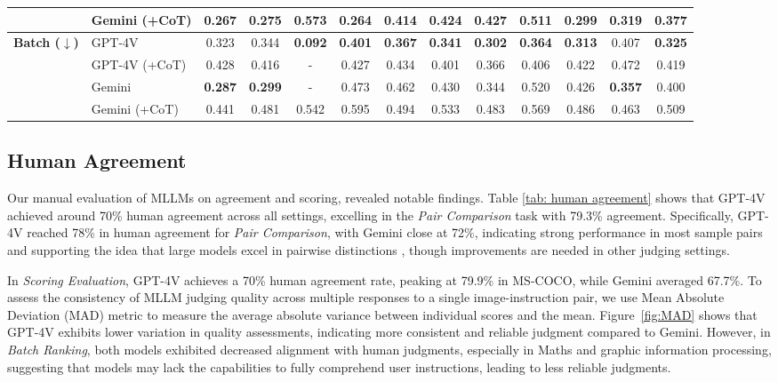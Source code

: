 \begin{table*}[ht]
{\begin{tabular}{ll|ccccccccccc}
 & Gemini (+CoT) & 0.267 & 0.275 & 0.573 & 0.264 & 0.414 & 0.424 & 0.427 & 0.511 & 0.299 & 0.319 & 0.377 \\ \midrule
\multirow{4}{*}{\textbf{Batch ($\downarrow$)}} & GPT-4V & 0.323 & 0.344 & \textbf{0.092} & \textbf{0.401} & \textbf{0.367} & \textbf{0.341} & \textbf{0.302} & \textbf{0.364} & \textbf{0.313} & 0.407 & \textbf{0.325} \\
 & GPT-4V (+CoT) & 0.428 & 0.416 & - & 0.427 & 0.434 & 0.401 & 0.366 & 0.406 & 0.422 & 0.472 & 0.419 \\
 & Gemini & \textbf{0.287} & \textbf{0.299} & - & 0.473 & 0.462 & 0.430 & 0.344 & 0.520 & 0.426 & \textbf{0.357} & 0.400 \\
 & Gemini (+CoT) & 0.441 & 0.481 & 0.542 & 0.595 & 0.494 & 0.533 & 0.483 & 0.569 & 0.486 & 0.463 & 0.509 \\
 \bottomrule[1.5pt]
\end{tabular}}
  \vspace{-10pt}
  \label{tab: COT result}
\end{table*}

\subsection{Human Agreement}
Our manual evaluation of MLLMs on agreement and scoring, revealed notable findings. Table \ref{tab: human agreement} shows that GPT-4V achieved around 70\% human agreement across all settings, excelling in the \textit{Pair Comparison} task with 79.3\% agreement. Specifically, GPT-4V reached 78\% in human agreement for \textit{Pair Comparison}, with Gemini close at 72\%, indicating strong performance in most sample pairs and supporting the idea that large models excel in pairwise distinctions \citep{zheng2023judging}, though improvements are needed in other judging settings.

In \textit{Scoring Evaluation}, GPT-4V achieves a 70\% human agreement rate, peaking at 79.9\% in MS-COCO, while Gemini averaged 67.7\%. To assess the consistency of MLLM judging quality across multiple responses to a single image-instruction pair, we use Mean Absolute Deviation (MAD) metric to measure the average absolute variance between individual scores and the mean. 
Figure~\ref{fig:MAD} shows that GPT-4V exhibits lower variation in quality assessments, indicating more consistent and reliable judgment compared to Gemini. However, in \textit{Batch Ranking}, both models exhibited decreased alignment with human judgments, especially in Maths and graphic information processing, suggesting that models may lack the capabilities to fully comprehend user instructions, leading to less reliable judgments.

